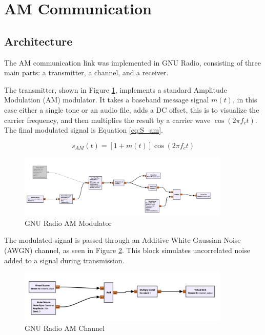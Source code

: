 \section{AM Communication}
\label{gnuradio_am}

\subsection{Architecture}

The AM communication link was implemented in GNU Radio, consisting of three main parts: a transmitter, a channel, and a receiver.

The transmitter, shown in Figure \ref{fig:GNU_am_mod}, implements a standard Amplitude Modulation (AM) modulator. It takes a baseband message signal $m(t)$, in this case either a single tone or an audio file, adds a DC offset, this is to visualize the carrier frequency, and then multiplies the result by a carrier wave $\cos(2\pi f_c t)$. The final modulated signal is Equation \ref{eq:S_am}.

\begin{equation}
    s_{AM}(t) = [1 + m(t)] \cos(2\pi f_c t)
    \label{eq:S_am}
\end{equation}


\begin{figure}[H]
    \centering
    \includegraphics*[width=0.9\textwidth]{Images/GNU_AM_Mod.png}
    \caption{GNU Radio AM Modulator}
    \label{fig:GNU_am_mod}
\end{figure}

The modulated signal is passed through an Additive White Gaussian Noise (AWGN) channel, as seen in Figure \ref{fig:gnu_am_channel}. This block simulates uncorrelated noise added to a signal during transmission.

\begin{figure}[h]
    \centering
    \includegraphics*[width=0.9\textwidth]{images/GNU_am_Channel.png}
    \caption{GNU Radio AM Channel}
    \label{fig:gnu_am_channel}
\end{figure}

